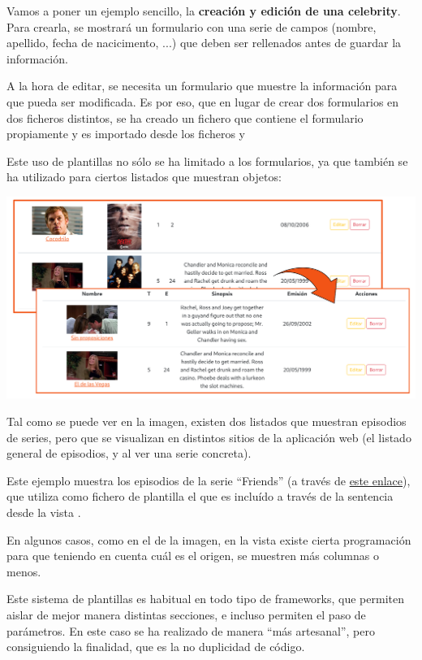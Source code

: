 \documentclass{\ClassPath/viu-tfm-template}
\begin{document}
Vamos a poner un ejemplo sencillo, la \textbf{creación y edición de una celebrity}. Para crearla, se mostrará un  formulario con una serie de campos (nombre, apellido, fecha de nacicimento, ...) que deben ser rellenados antes de guardar la información.

A la hora de editar, se necesita un formulario que muestre la información para que pueda ser modificada. Es por eso, que en lugar de crear dos formularios en dos ficheros distintos, se ha creado un fichero  que contiene el formulario propiamente y es importado desde los ficheros  y 

Este uso de plantillas no sólo se ha limitado a los formularios, ya que también se ha utilizado para ciertos listados que muestran objetos:
\begin{center}
    \includegraphics[width=0.8\linewidth]{img/vistas.png}
\end{center}

Tal como se puede ver en la imagen, existen dos listados que muestran episodios de series, pero que se visualizan en distintos sitios de la aplicación web (el listado general de episodios, y al ver una serie concreta).

Este ejemplo muestra los episodios de la serie “Friends” (a través de \href{http://localhost/views/tvshows/show.php?id=4}{este enlace}), que utiliza como fichero de plantilla  el  que es incluído a través de la sentencia  desde la vista .

En algunos casos, como en el de la imagen, en la vista existe cierta programación para que teniendo en cuenta cuál es el origen, se muestren más columnas o menos.

Este sistema de plantillas es habitual en todo tipo de frameworks, que permiten aislar de mejor manera distintas secciones, e incluso permiten el paso de parámetros. En este caso se ha realizado de manera “más artesanal”, pero consiguiendo la finalidad, que es la no duplicidad de código.
\end{document}
